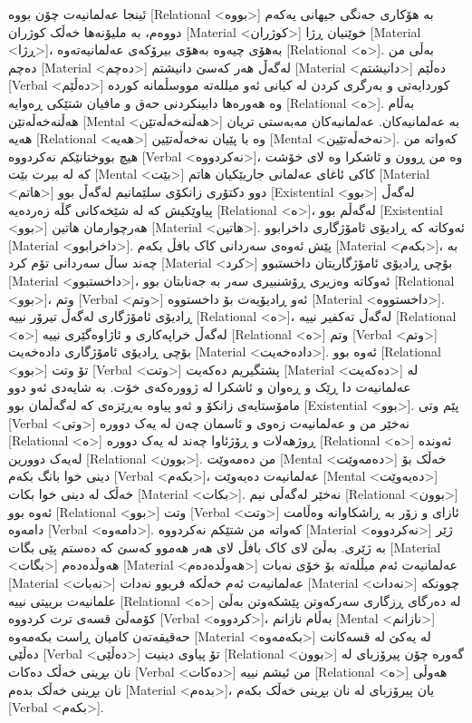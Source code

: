 ئینجا عەلمانیەت چۆن بووە [Relational <بووە>] بە هۆکاری جەنگی جیهانی یەکەم دووەم، بە ملیۆنەها خەڵک کوژران [Material <کوژران>] خوێنیان ڕژا [Material <ڕژا>]، بەهۆی چیەوە بەهۆی بیرۆکەی عەلمانیەتەوە [Relational <ە>]. بەڵی من دەچم [Material <دەچم>] لەگەڵ هەر کەسێ دانیشتم [Material <دانیشتم>] دەڵێم [Verbal <دەڵێم>] کوردایەتی و بەرگری کردن لە کیانی ئەو میللەتە مووسڵمانە کوردە وە هەورەها دابینکردنی حەق و مافیان شتێکی ڕەوایە [Relational <ە>]. بەڵام هەڵنەخەڵەتێن [Mental <هەڵنەخەڵەتێن>] بە عەلمانیەکان. عەلمانیەکان مەبەستی تریان هەیە [Relational <هەیە>] وە با پێیان نەخەڵەتێین [Mental <نەخەڵەتێین>].
کەواتە من هیچ بووختانێکم نەکردووە [Verbal <نەکردووە>]، وە من ڕوون و ئاشکرا وە لای خۆشت کە لە بیرت بێت [Mental <بێت>] کاکی ئاغای عەلمانی جاریێکیان هاتم [Material <هاتم>] دوو دکتۆری زانکۆی سلێمانیم لەگەڵ بوو [Existential <بوو>] لەگەڵ پیاوێکیش کە لە شێخەکانی گڵە زەردەیە [Relational <ە>]، لەگەڵم بوو [Existential <بوو>] هەرچوارمان هاتین [Material <هاتین>].
ئەوکاتە کە ڕادیۆی ئامۆژگاری داخرابوو [Material <داخرابوو>]. پێش ئەوەی سەردانی کاک بافڵ بکەم [Material <بکەم>]، بە چەند ساڵ سەردانی تۆم کرد [Material <کرد>] بۆچی ڕادیۆی ئامۆژگاریتان داخستبوو [Material <داخستبوو>]، ئەوکاتە وەزیری ڕۆشنبیری سەر بە جەنابتان بوو [Relational <بوو>]، وتم [Verbal <وتم>] ئەو ڕادیۆیەت بۆ داخستووە [Material <داخستووە>]. ڕادیۆی ئامۆژگاری لەگەڵ تیرۆر نییە [Relational <ە>]، لەگەڵ تەکفیر نییە [Relational <ە>] لەگەڵ خراپەکاری و ئاژاوەگێری نییە [Relational <ە>] وتم [Verbal <وتم>] بۆچی ڕادیۆی ئامۆژگاری دادەخەیت [Material <دادەخەیت>]. ئەوە بوو [Relational <بوو>] تۆ وتت [Verbal <وتت>] پشتگیریم دەکەیت [Material <دەکەیت>] لە عەلمانیەت دا ڕێک و ڕەوان و ئاشکرا لە ژوورەکەی خۆت. بە شایەدی ئەو دوو مامۆستایەی زانکۆ و ئەو پیاوە بەڕێزەی کە لەگەڵمان بوو [Existential <بوو>]. پێم وتی [Verbal <وتی>] نەخێر من و عەلمانیەت زەوی و ئاسمان چەن لە یەک دوورە [Relational <ە>] ڕوژهەلات و ڕۆژئاوا چەند لە یەک دوورە [Relational <ە>] ئەوندە لەیەک دوورین [Relational <بوون>]. من دەمەوێت [Mental <دەمەوێت>] خەڵک بۆ دینی خوا بانگ بکەم [Verbal <بکەم>]، عەلمانیەت دەیەوێت [Mental <دەیەوێت>] خەڵک لە دینی خوا بکات [Material <بکات>]. نەخێر لەگەڵی نیم [Relational <بوون>] ئەوە بوو [Relational <بوو>] وتت [Verbal <وتت>] ئازای و زۆر بە ڕاشکاوانە وەڵامت دامەوە [Verbal <دامەوە>].
کەواتە من شتێکم نەکردووە [Material <نەکردووە>] ژێر بە ژێری. بەڵێ لای کاک بافڵ لای هەر هەموو کەسێ کە دەستم پێی بگات [Material <بگات>] هەوڵدەدەم [Material <هەوڵدەدەم>] عەلمانیەت ئەم میڵلەتە بۆ خۆی نەبات [Material <نەبات>] عەلمانیەت ئەم خەڵکە فریوو نەدات [Material <نەدات>] چوونکە علمانیەت برییتی نییە [Relational <ە>] لە دەرگای ڕزگاری سەرکەوتن پێشکەوتن بەڵێ کۆمەڵێ قسەی ترت کردووە [Verbal <کردووە>]، بەڵام نازانم [Mental <نازانم>] حەقیقەتەن کامیان ڕاست بکەمەوە [Material <بکەمەوە>] لە یەکێ لە قسەکانت دەڵێی [Verbal <دەڵێی>] تۆ پیاوی دینیت [Relational <بوون>] گەورە چۆن پیرۆزبای له نان بڕینی خەڵک دەکات [Verbal <دەکات>] من ئیشم نییە [Relational <ە>] هەوڵی نان بڕینی خەڵک بدەم [Material <بدەم>]، یان پیرۆزبای له نان بڕینی خەڵک بکەم [Verbal <بکەم>].
